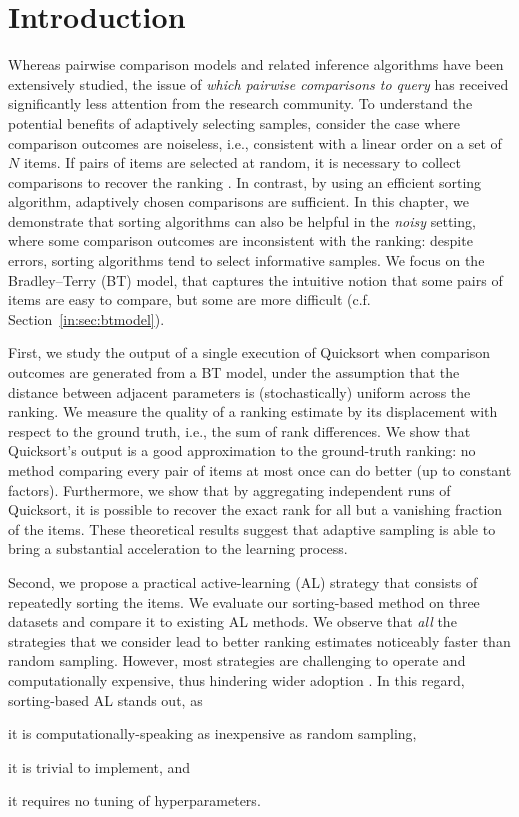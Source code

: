\section{Introduction}  %
\label{rs:sec:intro}

Whereas pairwise comparison models and related inference algorithms have been extensively studied, the issue of \emph{which pairwise comparisons to query} has received significantly less attention from the research community.
To understand the potential benefits of adaptively selecting samples, consider the case where comparison outcomes are noiseless, i.e., consistent with a linear order on a set of $N$ items.
If pairs of items are selected at random, it is necessary to collect  comparisons to recover the ranking \citep{alon1994linear}.
In contrast, by using an efficient sorting algorithm,  adaptively chosen comparisons are sufficient.
In this chapter, we demonstrate that sorting algorithms can also be helpful in the \emph{noisy} setting, where some comparison outcomes are inconsistent with the ranking: despite errors, sorting algorithms tend to select informative samples.
We focus on the Bradley--Terry (BT) model, that captures the intuitive notion that some pairs of items are easy to compare, but some are more difficult (c.f. Section~\ref{in:sec:btmodel}).

First, we study the output of a single execution of Quicksort when comparison outcomes are generated from a BT model, under the assumption that the distance between adjacent parameters is (stochastically) uniform across the ranking.
We measure the quality of a ranking estimate by its displacement with respect to the ground truth, i.e., the sum of rank differences.
We show that Quicksort's output is a good approximation to the ground-truth ranking: no method comparing every pair of items at most once can do better (up to constant factors).
Furthermore, we show that by aggregating  independent runs of Quicksort, it is possible to recover the exact rank for all but a vanishing fraction of the items.
These theoretical results suggest that adaptive sampling is able to bring a substantial acceleration to the learning process.

Second, we propose a practical active-learning (AL) strategy that consists of repeatedly sorting the items.
We evaluate our sorting-based method on three datasets and compare it to existing AL methods.
We observe that \emph{all} the strategies that we consider lead to better ranking estimates noticeably faster than random sampling.
However, most strategies are challenging to operate and computationally expensive, thus hindering wider adoption \citep{schein2007active}.
In this regard, sorting-based AL stands out, as
\begin{enuminline}
\item it is computationally-speaking as inexpensive as random sampling, 
\item it is trivial to implement, and
\item it requires no tuning of hyperparameters.
\end{enuminline}

